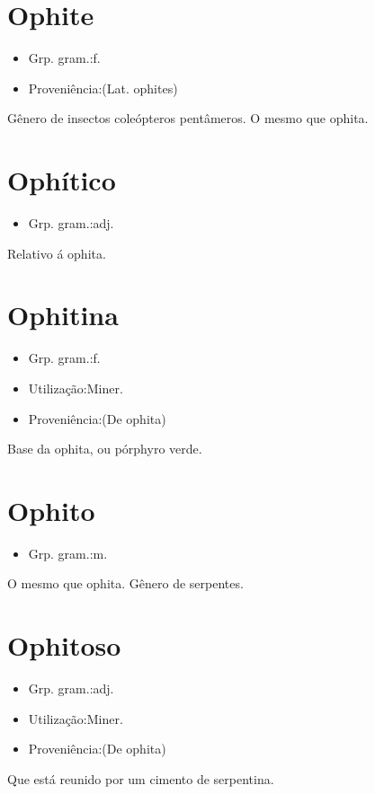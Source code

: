 \section{Ophite}
\begin{itemize}
\item {Grp. gram.:f.}
\end{itemize}
\begin{itemize}
\item {Proveniência:(Lat. \textunderscore ophites\textunderscore )}
\end{itemize}
Gênero de insectos coleópteros pentâmeros.
O mesmo que \textunderscore ophita\textunderscore .
\section{Ophítico}
\begin{itemize}
\item {Grp. gram.:adj.}
\end{itemize}
Relativo á ophita.
\section{Ophitina}
\begin{itemize}
\item {Grp. gram.:f.}
\end{itemize}
\begin{itemize}
\item {Utilização:Miner.}
\end{itemize}
\begin{itemize}
\item {Proveniência:(De \textunderscore ophita\textunderscore )}
\end{itemize}
Base da ophita, ou pórphyro verde.
\section{Ophito}
\begin{itemize}
\item {Grp. gram.:m.}
\end{itemize}
O mesmo que \textunderscore ophita\textunderscore .
Gênero de serpentes.
\section{Ophitoso}
\begin{itemize}
\item {Grp. gram.:adj.}
\end{itemize}
\begin{itemize}
\item {Utilização:Miner.}
\end{itemize}
\begin{itemize}
\item {Proveniência:(De \textunderscore ophita\textunderscore )}
\end{itemize}
Que está reunido por um cimento de serpentina.

